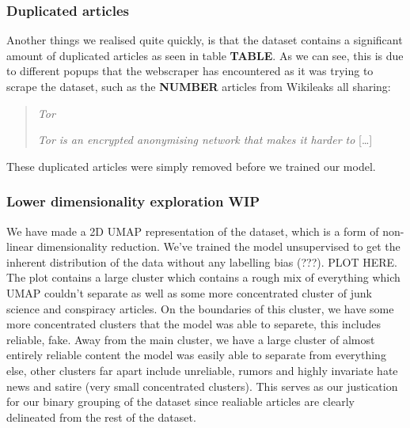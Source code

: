 \subsubsection{Duplicated articles}
Another things we realised quite quickly, is that the dataset contains a significant amount of duplicated articles as
seen in table \textbf{TABLE}. As we can see, this is due to different popups that the webscraper has encountered as it
was trying to scrape the dataset, such as the \textbf{NUMBER} articles from Wikileaks all sharing:
\begin{quote}
    \textit{Tor}

    \textit{Tor is an encrypted anonymising network that makes it harder to} [\dots]\\

\end{quote}
These duplicated articles were simply removed before we trained our model.

\subsubsection{Lower dimensionality exploration WIP}
We have made a 2D UMAP representation of the dataset, which is a form of non-linear dimensionality reduction. We've trained the model unsupervised to get the inherent distribution of the data without any labelling bias (???). PLOT HERE. The plot contains a large cluster which contains a rough mix of everything which UMAP couldn't separate as well as some more concentrated cluster of junk science and conspiracy articles. On the boundaries of this cluster, we have some more concentrated clusters that the model was able to separete, this includes reliable, fake. Away from the main cluster, we have a large cluster of almost entirely reliable content the model was easily able to separate from everything else, other clusters far apart include unreliable, rumors and highly invariate hate news and satire (very small concentrated clusters). This serves as our justication for our binary grouping of the dataset since realiable articles are clearly delineated from the rest of the dataset. 



